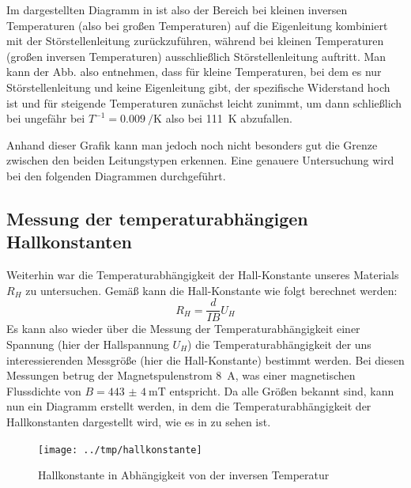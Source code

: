 Im dargestellten Diagramm in  ist also der Bereich bei kleinen
inversen Temperaturen (also bei großen Temperaturen) auf die Eigenleitung
kombiniert mit der Störstellenleitung zurückzuführen, während bei kleinen
Temperaturen (großen inversen Temperaturen) ausschließlich Störstellenleitung
auftritt. Man kann der Abb. also entnehmen, dass für kleine Temperaturen,
bei dem es nur Störstellenleitung und keine Eigenleitung gibt, der spezifische
Widerstand hoch ist und für steigende Temperaturen zunächst leicht zunimmt, um
dann schließlich bei ungefähr bei $T^{-1} = \SI{0,009}{\per\kelvin}$ also bei \SI{111}{\kelvin}
abzufallen.

Anhand dieser Grafik kann man jedoch noch nicht besonders gut die Grenze
zwischen den beiden Leitungstypen erkennen. Eine genauere
Untersuchung wird bei den folgenden Diagrammen durchgeführt.

\subsection{Messung der temperaturabhängigen Hallkonstanten}

Weiterhin war die Temperaturabhängigkeit der Hall-Konstante unseres Materials
$R_H$ zu untersuchen. Gemäß \cite[Gl. (XIV.2)]{ibach} kann die Hall-Konstante
wie folgt berechnet werden: 
\begin{equation}
R_H = \frac{d}{I B} U_H
\end{equation}
Es kann also wieder über die Messung der Temperaturabhängigkeit einer Spannung
(hier der Hallspannung $U_H$) die Temperaturabhängigkeit der uns
interessierenden Messgröße (hier die Hall-Konstante) bestimmt werden. Bei
diesen Messungen betrug der Magnetspulenstrom \SI{8}{\ampere}, was einer
magnetischen Flussdichte von $B=\SI{443(4)}{\milli\tesla}$ entspricht.
Da alle Größen bekannt sind, kann nun ein Diagramm erstellt werden, in dem die
Temperaturabhängigkeit der Hallkonstanten dargestellt wird, wie es in
 zu sehen ist.
\begin{figure}[htb]
   \centering
   \texttt{[image: ../tmp/hallkonstante]}
   \caption{Hallkonstante in Abhängigkeit von der inversen Temperatur}
   \label{fig:hallkonstante}
\end{figure}


